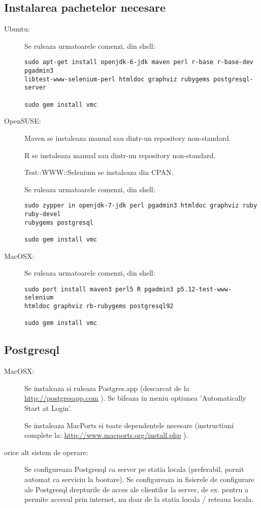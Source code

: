\subsection{Instalarea pachetelor necesare}
\begin{description}
\item[Ubuntu:]
Se ruleaza urmatoarele comenzi, din shell:
\begin{lstlisting}[breaklines=true]
sudo apt-get install openjdk-6-jdk maven perl r-base r-base-dev pgadmin3
libtest-www-selenium-perl htmldoc graphviz rubygems postgresql-server

sudo gem install vmc
\end{lstlisting}

\item[OpenSUSE:]
Maven se instaleaza manual sau dintr-un repository non-standard.

R se instaleaza manual sau dintr-un repository non-standard.

Test::WWW::Selenium se instaleaza din CPAN.

Se ruleaza urmatoarele comenzi, din shell:
\begin{lstlisting}[breaklines=true]
sudo zypper in openjdk-7-jdk perl pgadmin3 htmldoc graphviz ruby ruby-devel
rubygems postgresql

sudo gem install vmc
\end{lstlisting}

\item[MacOSX:]

Se ruleaza urmatoarele comenzi, din shell:
\begin{lstlisting}[breaklines=true]
sudo port install maven3 perl5 R pgadmin3 p5.12-test-www-selenium
htmldoc graphviz rb-rubygems postgresql92

sudo gem install vmc
\end{lstlisting}
\end{description}

\subsection{Postgresql}
\begin{description}
\item[MacOSX:]

Se instaleaza si ruleaza Postgres.app (descarcat de la \url{http://postgresapp.com} ).
Se bifeaza in meniu optiunea 'Automatically Start at Login'.

Se instaleaza MacPorts si toate dependentele necesare (instructiuni complete la:
\url{http://www.macports.org/install.php} ).

\item[orice alt sistem de operare:]

Se configureaza Postgresql ca server pe statia locala (preferabil, pornit
automat ca serviciu la bootare). 
Se configureaza in fisierele de configurare ale Postgresql drepturile
de acces ale clientilor la server, de ex. pentru a permite accesul prin
internet, nu doar de la statia locala / reteaua locala.
\end{description}

